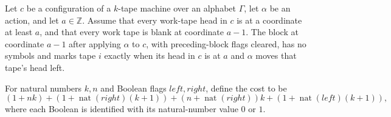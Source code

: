 \begin{lemma}
\label{Turing.FinTM.dg_new_left_row}
\leanok
{}
Let $c$ be a configuration of a $k$-tape machine over an alphabet $\Gamma$, let $\alpha$
be an action, and let $a\in\mathbb{Z}$. Assume that every work-tape head in $c$ is at a
coordinate at least $a$, and that every work tape is blank at coordinate $a-1$. The
block at coordinate $a-1$ after applying $\alpha$ to $c$, with preceding-block flags
cleared, has no symbols and marks tape $i$ exactly when its head in $c$ is at $a$ and
$\alpha$ moves that tape's head left.
\end{lemma}

\begin{definition}
\label{Turing.FinTM.dgCost}
\leanok
For natural numbers $k,n$ and Boolean flags $left,right$, define the cost to be $$(1+n
k)+(1+\operatorname{nat}(right)(k+1))+(n+\operatorname{nat}(right))k+(1+\operatorname{nat}(left)(k+1)),$$
where each Boolean is identified with its natural-number value $0$ or $1$.
\end{definition}


